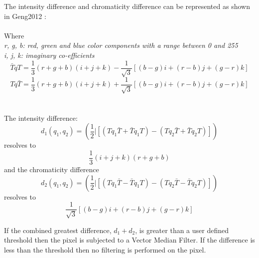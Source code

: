 \begin{description}
The intensity difference and chromaticity difference can be represented as shown in Geng2012 \cite{Geng2012150}:
\\
\\ Where
\\ \textit{r, g, b: red, green and blue color components with a range between 0 and 255}
\\ \textit{i, j, k: imaginary co-efficients}
\begin{equation}
\bar{T}qT = \frac{1}{3}(r+g+b)(i+j+k)-\frac{1}{\sqrt{3}}[(b-g)i+(r-b)j+(g-r)k]
\end{equation}
\begin{equation}
Tq\bar{T} = \frac{1}{3}(r+g+b)(i+j+k)+\frac{1}{\sqrt{3}}[(b-g)i+(r-b)j+(g-r)k]
\end{equation}
\\
\\
The intensity difference:
\begin{equation}
d_1(q_1,q_2)=(\frac{1}{2}|[(Tq_1\bar{T}+\bar{T}q_1T)-(Tq_2\bar{T}+\bar{T}q_2T)])
\end{equation}
resolves to
\begin{equation}
\frac{1}{3}(i+j+k)(r+g+b)
\end{equation}
and the chromaticity difference
\begin{equation}
d_2(q_1,q_2)=(\frac{1}{2}|[(Tq_1\bar{T}-\bar{T}q_1T)-(Tq_2\bar{T}-\bar{T}q_2T)])
\end{equation}
resolves to
\begin{equation}
\frac{1}{\sqrt{3}}[(b-g)i+(r-b)j+(g-r)k]
\end{equation}

If the combined greatest difference, $d_1 + d_2$, is greater than a user defined threshold then the pixel is subjected to a Vector Median Filter. If the difference is less than the threshold then no filtering is performed on the pixel.
\end{description}
 
